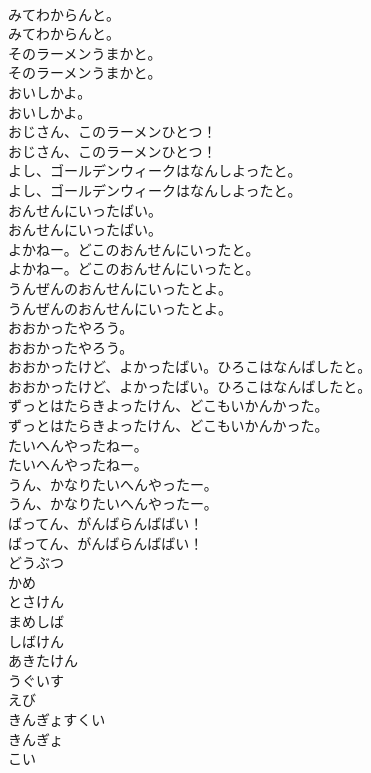 \documentclass[8pt]{extreport}
\begin{document}
\begin{CJK}{UTF8}{min}
\\	みてわからんと。	
\\	みてわからんと。 
\\	そのラーメンうまかと。	
\\	そのラーメンうまかと。 
\\	おいしかよ。	
\\	おいしかよ。 
\\	おじさん、このラーメンひとつ！	
\\	おじさん、このラーメンひとつ！ 
\\	よし、ゴールデンウィークはなんしよったと。	
\\	よし、ゴールデンウィークはなんしよったと。 
\\	おんせんにいったばい。	
\\	おんせんにいったばい。 
\\	よかねー。どこのおんせんにいったと。	
\\	よかねー。どこのおんせんにいったと。 
\\	うんぜんのおんせんにいったとよ。	
\\	うんぜんのおんせんにいったとよ。 
\\	おおかったやろう。	
\\	おおかったやろう。 
\\	おおかったけど、よかったばい。ひろこはなんばしたと。	
\\	おおかったけど、よかったばい。ひろこはなんばしたと。 
\\	ずっとはたらきよったけん、どこもいかんかった。	
\\	ずっとはたらきよったけん、どこもいかんかった。 
\\	たいへんやったねー。	
\\	たいへんやったねー。 
\\	うん、かなりたいへんやったー。	
\\	うん、かなりたいへんやったー。 
\\	ばってん、がんばらんばばい！	
\\	ばってん、がんばらんばばい！ 
\\	どうぶつ
\\	かめ
\\	とさけん
\\	まめしば
\\	しばけん
\\	あきたけん
\\	うぐいす
\\	えび
\\	きんぎょすくい
\\	きんぎょ
\\	こい

\end{CJK}
\end{document}
